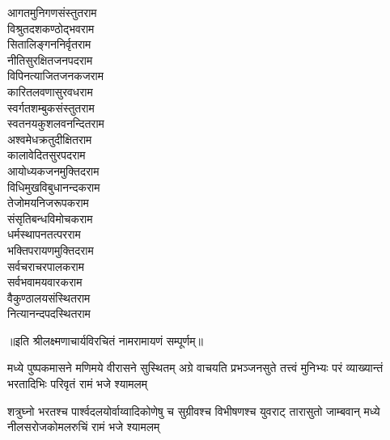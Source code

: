 \begin{large}
\begin{multicols}{2}
आगतमुनिगणसंस्तुत\hfill राम\\
विश्रुतदशकण्ठोद्भव\hfill राम\\
सितालिङ्गननिर्वृत\hfill राम\\
नीतिसुरक्षितजनपद\hfill राम\\
विपिनत्याजितजनकज\hfill राम\\
कारितलवणासुरवध\hfill राम\\
स्वर्गतशम्बुकसंस्तुत\hfill राम\\
स्वतनयकुशलवनन्दित\hfill राम\\
अश्वमेधक्रतुदीक्षित\hfill राम\\
कालावेदितसुरपद\hfill राम\\
आयोध्यकजनमुक्तिद\hfill राम\\
विधिमुखविबुधानन्दक\hfill राम\\
तेजोमयनिजरूपक\hfill राम\\
संसृतिबन्धविमोचक\hfill राम\\
धर्मस्थापनतत्पर\hfill राम\\
भक्तिपरायणमुक्तिद\hfill राम\\
सर्वचराचरपालक\hfill राम\\
सर्वभवामयवारक\hfill राम\\
वैकुण्ठालयसंस्थित\hfill राम\\
नित्यानन्दपदस्थित\hfill राम\\
\jaya
\end{multicols}
\vspace{-0.5cm}
॥इति श्रीलक्ष्मणाचार्यविरचितं नामरामायणं सम्पूर्णम्॥
\end{large}

\closesection

{मध्ये पुष्पकमासने मणिमये वीरासने सुस्थितम्}
{अग्रे वाचयति प्रभञ्जनसुते तत्त्वं मुनिभ्यः परं}
{व्याख्यान्तं भरतादिभिः परिवृतं रामं भजे श्यामलम्}

{शत्रुघ्नो भरतश्च पार्श्वदलयोर्वाय्वादिकोणेषु च}
{सुग्रीवश्च विभीषणश्च युवराट् तारासुतो जाम्बवान्}
{मध्ये नीलसरोजकोमलरुचिं रामं भजे श्यामलम्}
